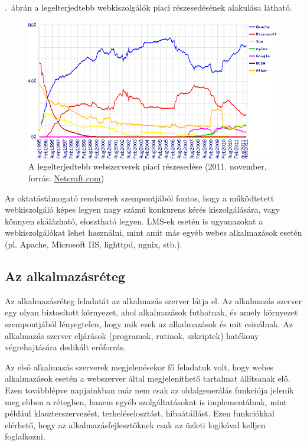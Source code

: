 .~ábrán a legelterjedtebb webkiszolgálók piaci részesedésének alakulása látható.

\begin{figure}[h!]
\centering
\includegraphics[width=1.0\textwidth]{figures/wpid-overallc.png}
\caption{A legelterjedtebb webszerverek piaci részesedése (2011. november, forrás: \href{http://news.netcraft.com/archives/2011/11/07/november-2011-web-server-survey.html}{Netcraft.com}) \label{fig:netcraft_webservers}}
\end{figure}

Az oktatástámogató rendszerek szempontjából fontos, hogy a működtetett webkiszolgáló képes legyen nagy számú konkurens kérés kiszolgálására, vagy könnyen skálázható, elosztható legyen. LMS-ek esetén is ugyanazokat a webkiszolgálókat lehet használni, mint amit más egyéb webes alkalmazások esetén (pl. Apache, Microsoft IIS, lighttpd, ngnix, stb.).
 
\subsection{Az alkalmazásréteg}
Az alkalmazásréteg feladatát az alkalmazás szerver látja el. Az alkalmazás szerver egy olyan biztosított környezet, ahol alkalmazások futhatnak, és amely környezet szempontjából lényegtelen, hogy mik ezek az alkalmazások és mit csinálnak.\cite{serverside} Az alkalmazás szerver eljárások (programok, rutinok, szkriptek) hatékony végrehajtására dedikált erőforrás.

Az első alkalmazás szerverek megjelenésekor fő feladatuk volt, hogy webes alkalmazások esetén a webszerver által megjeleníthető tartalmat állítsanak elő. Ezen továbblépve napjainkban már nem csak az oldalgenerálás funkciója jelenik meg ebben a rétegben, hanem egyéb szolgáltatásokat is implementálnak, mint például klaszterszervezést, terheléselosztást, hibaátállást. Ezen funkciókkal elérhető, hogy az alkalmazásfejlesztőknek csak az üzleti logikával kelljen foglalkozni.

